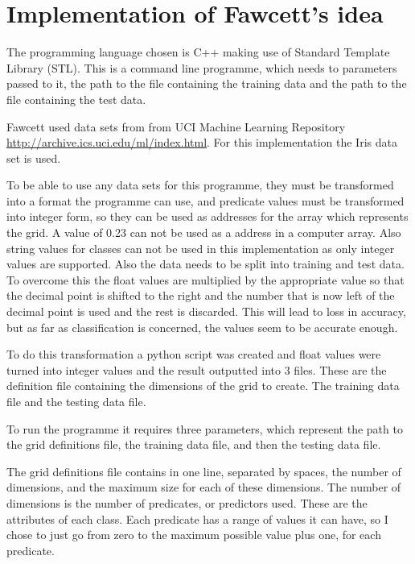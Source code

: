 \documentclass[11pt]{article}
\begin{document}
\section{Implementation of Fawcett's \cite{fawcett08} idea}
\label{sec-4}



The programming language chosen is C++ making use of Standard Template
Library (STL).  This is a command line programme, which needs to
parameters passed to it, the path to the file containing the training
data and the path to the file containing the test data.

Fawcett \cite{fawcett08} used data sets from from UCI Machine Learning
Repository \href{http://archive.ics.uci.edu/ml/index.html}{http://archive.ics.uci.edu/ml/index.html}.  For this
implementation the Iris data set is used.

To be able to use any data sets for this programme, they must be
transformed into a format the programme can use, and predicate values
must be transformed into integer form, so they can be used as
addresses for the array which represents the grid.  A value of 0.23
can not be used as a address in a computer array.  Also string values
for classes can not be used in this implementation as only integer
values are supported.  Also the data needs to be split into training
and test data.  To overcome this the float values are multiplied by
the appropriate value so that the decimal point is shifted to the
right and the number that is now left of the decimal point is used and
the rest is discarded.  This will lead to loss in accuracy, but as far
as classification is concerned, the values seem to be accurate enough.

To do this transformation a python script was created and float values
were turned into integer values and the result outputted into 3 files.
These are the definition file containing the dimensions of the grid to
create. The training data file and the testing data file.

To run the programme it requires three parameters, which represent the
path to the grid definitions file, the training data file, and then
the testing data file. 

The grid definitions file contains in one line, separated by spaces,
the number of dimensions, and the maximum size for each of these
dimensions. The number of dimensions is the number of predicates, or
predictors used.  These are the attributes of each class. Each
predicate has a range of values it can have, so I chose to just go
from zero to the maximum possible value plus one, for each predicate.
\end{document}
